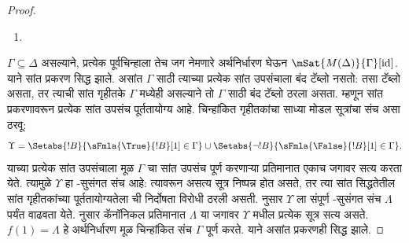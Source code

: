 \documentclass[../../../include/open-logic-section]{subfiles}
\begin{document}
\begin{proof}
\begin{enumerate}
{{      $\sFmla{\False}{\indfrm}[\sigma] \in \Delta$
      असेल, तर शाखा संपूर्ण असल्याने
      काही $\sigma.n$ साठी
      $\sFmla{\False}{!B}[\sigma.n] \in \Delta$.
      आगमनाच्या गृहीतकानुसार
      $\mSat/{M(\Delta)}{!B}[\sigma.n]$.
      $R\sigma(\sigma.n)$ असल्याने
      $\mSat/{M(\Delta)}{!B}[\sigma']$
      होईल असे~$\sigma'$ असते. म्हणून
      $\mSat/{M(\Delta)}{\indfrm}[\sigma]$.}}
  \item {}
\end{enumerate}
$\Gamma \subseteq \Delta$ असल्याने, प्रत्येक पूर्वचिन्हाला तेच जग
नेमणारे अर्थनिर्धारण घेऊन $\mSat{M(\Delta)}{\Gamma}[\mathrm{id}]$.
याने सांत प्रकरण सिद्ध झाले.
असांत $\Gamma$ साठी त्याच्या प्रत्येक सांत उपसंचाला बंद टॅब्लो
नसतो: तसा टॅब्लो असता, तर त्याची सांत गृहीतके $\Gamma$
मध्येही असल्याने तो $\Gamma$ साठी बंद टॅब्लो ठरला असता.
म्हणून सांत प्रकरणावरून प्रत्येक सांत उपसंच पूर्ततायोग्य आहे.
चिन्हांकित गृहीतकांचा साध्या मोडल सूत्रांचा संच असा ठरवू:
\[
\Upsilon = \Setabs{!B}{\sFmla{\True}{!B}[1]\in\Gamma}
\cup \Setabs{\lnot!B}{\sFmla{\False}{!B}[1]\in\Gamma}.
\]
याच्या प्रत्येक सांत उपसंचाला मूळ $\Gamma$ चा सांत उपसंच
पूर्ण करणाऱ्या प्रतिमानात एकाच जगावर सत्य करता येते.
त्यामुळे $\Upsilon$ हा -सुसंगत संच आहे: त्यावरून
असत्य सूत्र निष्पन्न होत असते, तर त्या सांत सिद्धतेतील सांत
गृहीतकांच्या पूर्ततायोग्यतेला  ची निर्दोषता विरोधी ठरली
असती.  नुसार
$\Upsilon$ ला संपूर्ण -सुसंगत संच $\Lambda$ पर्यंत
वाढवता येते.  नुसार
कॅनॉनिकल प्रतिमानात $\Lambda$ या जगावर $\Upsilon$ मधील
प्रत्येक सूत्र सत्य असते. $f(1)=\Lambda$ हे अर्थनिर्धारण मूळ
चिन्हांकित संच $\Gamma$ पूर्ण करते. याने असांत प्रकरणही सिद्ध झाले.
\end{proof}
\end{document}
